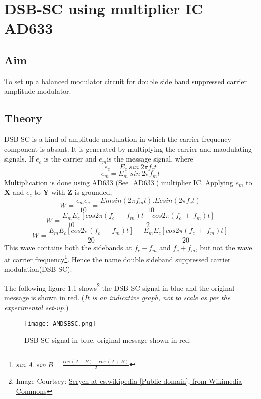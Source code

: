 \chapter[DSB-SC using multiplier IC AD633]{DSB-SC using multiplier IC AD633}
\label{chapdsbsc}
\section*{Aim}
To set up a balanced modulator circuit for double side band suppressed carrier amplitude modulator.
\section*{Theory}
DSB-SC is a kind of amplitude modulation in which the carrier frequency component is absant. It is generated by multiplying the carrier and maodulating signals. If $e_c$ is the carrier and $e_m$is the message signal, where
\begin{equation}
e_c=E_c\  sin\ 2\pi f_ct
\end{equation}
\begin{equation}
e_m=E_m\  sin\ 2\pi f_mt
\end{equation}
Multiplication is done using AD633 (See \ref{AD633}) multiplier IC.
Applying $e_m$ to $\textbf{X}$ and $e_c$ to $\textbf{Y}$ with $\textbf{Z}$ is grounded, 
\begin{equation}
W= \frac{e_me_c}{10} =\frac{Emsin(2\pi f_mt).Ecsin(2\pi f_ct)}{10}
\end{equation}
\begin{equation}
W= \frac{E_mE_c}{10} \frac{[cos 2\pi (f_c\ -\ f_m)t-cos 2\pi (f_c\ +\ f_m)t]}{2}
\end{equation}
\begin{equation}
W= \frac{E_mE_c [cos 2\pi (f_c\ -\ f_m)t]}{20}- \frac{E_mE_c[cos 2\pi (f_c\ +\ f_m)t]}{20}
\end{equation}
This wave contains both the sidebands at $f_c-f_m$ and $f_c+f_m$, but not the wave at carrier frequency\footnote{$sin \ A.\ sin\ B=\frac{cos\ (A-B)-cos\ (A+B)}{2}$}. Hence the name double sideband suppressed carrier modulation(DSB-SC).

The following figure \ref{DSBSC} shows\footnote{Image Courtsey: \href{http://commons.wikimedia.org/wiki/File\%3AAM-DSBSC.png}{Serych at cs.wikipedia [Public domain], from Wikimedia Commons}} the DSB-SC signal in blue and the original message is shown in red. (\emph{It is an indicative graph, not to scale as per the experimental set-up.})
\begin{figure}[h]
\begin{center}
\texttt{[image: AMDSBSC.png]}
\caption{DSB-SC signal in blue, original message shown in red.}
\label{DSBSC}
\end{center}

\end{figure}

